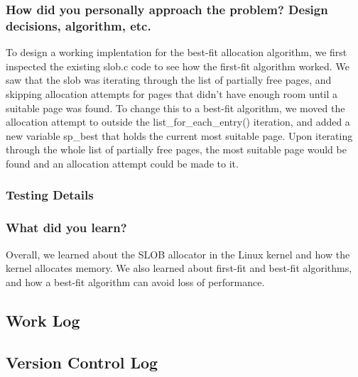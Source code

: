 \documentclass[journal, letterpaper, draftclsnofoot, onecolumn, 10pt]{IEEEtran}
\begin{document}
\subsubsection{How did you personally approach the problem? Design decisions, algorithm, etc.}



To design a working implentation for the best-fit allocation algorithm, we first inspected the existing slob.c code to see how the first-fit algorithm worked.
We saw that the slob was iterating through the list of partially free pages, and skipping allocation attempts for pages that didn't have enough room until a suitable page was found.
To change this to a best-fit algorithm, we moved the allocation attempt to outside the list\_for\_each\_entry() iteration, and added a new variable sp\_best that holds the current most suitable page.
Upon iterating through the whole list of partially free pages, the most suitable page would be found and an allocation attempt could be made to it. \\


\subsubsection{Testing Details}




\subsubsection{What did you learn?}

Overall, we learned about the SLOB allocator in the Linux kernel and how the kernel allocates memory.
We also learned about first-fit and best-fit algorithms, and how a best-fit algorithm can avoid loss of performance. \\


\subsection{Work Log}



\clearpage
\subsection{Version Control Log}



\FloatBarrier



\scalebox{0.8}{
}


\FloatBarrier
\end{document}
